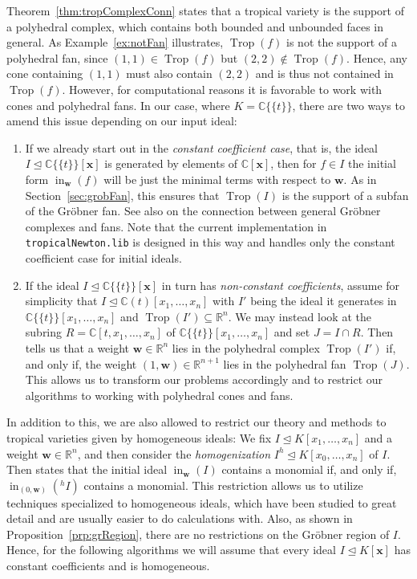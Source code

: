 \documentclass[
  paper=a4,
  titlepage,
  bibliography=totoc,
  pagesize=pdftex
]{scrartcl}
\numberwithin{figure}{section}
\numberwithin{equation}{section}
\numberwithin{table}{section}
\newcommand*\setR{\mathds{R}}
\newcommand*\setC{\mathds{C}}
\newcommand*\puiseux[2]{#1\{\!\{#2\}\!\}}
\newcommand*\CCt{\puiseux{\setC}{t}}
\let\vec\mathbf
\let\idealof\trianglelefteq
\DeclareMathOperator{\Trop}{Trop}
\DeclareMathOperator{\initial}{in}
\theoremstyle{definition}
\numberwithin{definition}{section}
\begin{document}
Theorem~\ref{thm:tropComplexConn} states that a tropical variety is the support of a
polyhedral complex, which contains both bounded and unbounded faces in general. As
Example~\ref{ex:notFan} illustrates, $\Trop(f)$ is not the support of a polyhedral fan,
since $(1,1) \in \Trop(f)$ but $(2,2) \not\in \Trop(f)$. Hence, any cone containing
$(1,1)$ must also contain $(2,2)$ and is thus not contained in $\Trop(f)$. However, for
computational reasons it is favorable to work with cones and polyhedral fans. In our case,
where $K = \CCt$, there are two ways to amend this issue depending on our input ideal:
\begin{enumerate}[label=\arabic*.]
  \item If we already start out in the \emph{constant coefficient case}, that is, the
    ideal $I \idealof \CCt[\vec x]$ is generated by elements of $\setC[\vec x]$, then for
    $f \in I$ the initial form $\initial_{\vec w}(f)$ will be just the minimal terms with
    respect to $\vec w$. As in Section~\ref{sec:grobFan}, this ensures that $\Trop(I)$ is
    the support of a subfan of the Gröbner fan. See also
    \cite[Remark~2.5.11]{sturmMacTrop} on the connection between general Gröbner complexes
    and fans. Note that the current implementation in \texttt{tropicalNewton.lib}
    \cite{tropNewtLib} is designed in this way and handles only the constant coefficient
    case for initial ideals.
  \item If the ideal $I\idealof\CCt[\vec x]$ in turn has \emph{non-constant coefficients},
    assume for simplicity that $I \idealof \setC(t)[x_1, \dots, x_n]$ with $I'$ being the
    ideal it generates in $\CCt[x_1, \dots, x_n]$ and $\Trop(I') \subseteq \setR^n$. We
    may instead look at the subring $R = \setC[t, x_1, \dots, x_n]$ of $\CCt[x_1, \dots,
    x_n]$ and set $J = I\cap R$. Then \cite[Lemma~1.1]{compTropVar} tells us that a weight
    $\vec w \in \setR^n$ lies in the polyhedral complex $\Trop(I')$ if, and only if, the
    weight $(1,\vec w) \in \setR^{n+1}$ lies in the polyhedral fan $\Trop(J)$. This allows
    us to transform our problems accordingly and to restrict our algorithms to working
    with polyhedral cones and fans.
\end{enumerate}
In addition to this, we are also allowed to restrict our theory and methods to tropical
varieties given by homogeneous ideals: We fix $I\idealof K[x_1, \dots, x_n]$ and a weight
$\vec w \in \setR^n$, and then consider the \emph{homogenization} $I^h \idealof K[x_0,
\dots, x_n]$ of $I$. Then \cite[Lemma~2.2]{compTropVar} states that the initial ideal
$\initial_{\vec w}(I)$ contains a monomial if, and only if, $\initial_{(0,\vec w)}(^hI)$
contains a monomial. This restriction allows us to utilize techniques specialized to
homogeneous ideals, which have been studied to great detail and are usually easier to do
calculations with. Also, as shown in Proposition~\ref{prp:grRegion}, there are no
restrictions on the Gröbner region of $I$. Hence, for the following algorithms we will
assume that every ideal $I \idealof K[\vec x]$ has constant coefficients and is
homogeneous.
\end{document}
